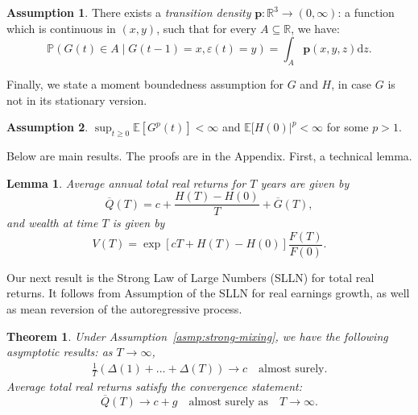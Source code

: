 \documentclass[12pt]{amsart}
\newtheorem{theorem}{Theorem}
\newtheorem{lemma}{Lemma}
\theoremstyle{definition}
\newtheorem{asmp}{Assumption}
\begin{document}
\begin{asmp}
There exists a {\it transition density} $\mathbf{p} : \mathbb R^3 \to (0, \infty)$: a  function which is continuous in $(x, y)$, such that for every $A \subseteq \mathbb R$, we have: 
$$
\mathbb P(G(t) \in A\mid G(t-1) = x, \varepsilon(t) = y) = \int_A\mathbf{p}(x, y, z)\mathrm{d}z.
$$
\label{asmp:Markov}
\end{asmp}

Finally, we state a moment boundedness assumption for $G$ and $H$, in case $G$ is not in its stationary version. 

\begin{asmp} $\sup_{t \ge 0}\mathbb E[G^{p}(t)] < \infty$ and $\mathbb E[H(0)|^p < \infty$ for some $p > 1$. 
\label{asmp:bdd}
\end{asmp}

Below are main results. The proofs are in the Appendix. First, a technical lemma.

\begin{lemma} Average annual total real returns for $T$ years are given by
\begin{equation}
\label{eq:mean-return}
\overline{Q}(T) = c + \frac{H(T) - H(0)}T + \overline{G}(T),
\end{equation}
and wealth at time $T$ is given by 
\begin{equation}
\label{eq:total-wealth}
V(T) = \exp\left[cT + H(T) - H(0)\right]\frac{F(T)}{F(0)}.
\end{equation}
\label{lemma:main}
\end{lemma}

Our next result is the Strong Law of Large Numbers (SLLN) for total real returns. It follows from Assumption of the SLLN for real earnings growth, as well as mean reversion of the autoregressive process.

\begin{theorem} Under Assumption~\ref{asmp:strong-mixing}, we have the following asymptotic results: as $T \to \infty$, 
\begin{align}
\label{eq:limiting-delta}
\frac1T(\Delta(1) + \ldots + \Delta(T)) \to c\quad \mbox{almost surely.}
\end{align}
Average total real returns satisfy the convergence statement:
\begin{equation}
\label{eq:R-LLN}
\overline{Q}(T) \to c + g\quad \mbox{almost surely as}\quad T \to \infty.
\end{equation}
\label{thm:SLLN}
\end{theorem}
\end{document}
